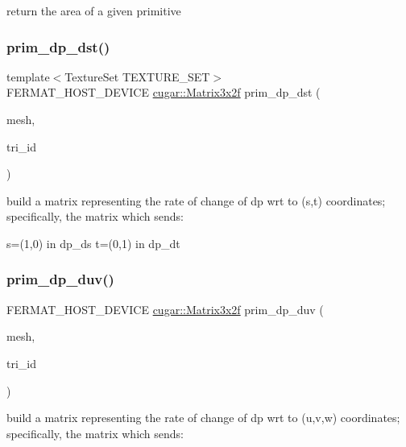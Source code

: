 return the area of a given primitive \mbox{\label{group___mesh_module_ga5b45fde0da8e24af3485a8e733d91cfb}} 
\subsubsection{\texorpdfstring{prim\+\_\+dp\+\_\+dst()}{prim\_dp\_dst()}}
{\footnotesize\ttfamily template$<$Texture\+Set T\+E\+X\+T\+U\+R\+E\+\_\+\+S\+ET$>$ \\
F\+E\+R\+M\+A\+T\+\_\+\+H\+O\+S\+T\+\_\+\+D\+E\+V\+I\+CE \hyperlink{structcugar_1_1_matrix}{cugar\+::\+Matrix3x2f} prim\+\_\+dp\+\_\+dst (\begin{DoxyParamCaption}\item[{const \hyperlink{struct_mesh_view}{Mesh\+View} \&}]{mesh,  }\item[{const uint32}]{tri\+\_\+id }\end{DoxyParamCaption})\hspace{0.3cm}{\ttfamily [inline]}}

build a matrix representing the rate of change of dp wrt to (s,t) coordinates; specifically, the matrix which sends\+:

s=(1,0) in dp\+\_\+ds t=(0,1) in dp\+\_\+dt \mbox{\label{group___mesh_module_ga2ec8688996dc87889bb37d46de8a9783}} 
\subsubsection{\texorpdfstring{prim\+\_\+dp\+\_\+duv()}{prim\_dp\_duv()}}
{\footnotesize\ttfamily F\+E\+R\+M\+A\+T\+\_\+\+H\+O\+S\+T\+\_\+\+D\+E\+V\+I\+CE \hyperlink{structcugar_1_1_matrix}{cugar\+::\+Matrix3x2f} prim\+\_\+dp\+\_\+duv (\begin{DoxyParamCaption}\item[{const \hyperlink{struct_mesh_view}{Mesh\+View} \&}]{mesh,  }\item[{const uint32}]{tri\+\_\+id }\end{DoxyParamCaption})\hspace{0.3cm}{\ttfamily [inline]}}

build a matrix representing the rate of change of dp wrt to (u,v,w) coordinates; specifically, the matrix which sends\+:


